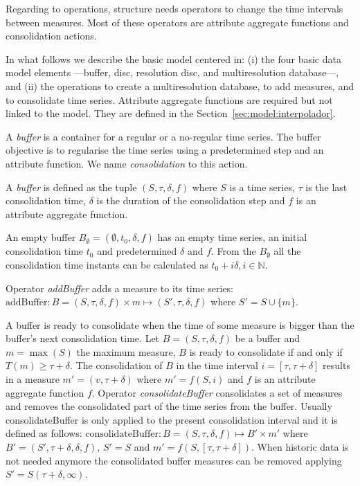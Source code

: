 Regarding to operations,  structure needs operators to
change the time intervals between measures. Most of these operators
are attribute aggregate functions and consolidation actions.

In what follows we describe the basic  model centered in:
(i) the four basic data model elements ---buffer, disc, resolution
disc, and multiresolution database---, and (ii) the operations to
create a multiresolution database, to add measures, and to consolidate
time series. Attribute aggregate functions are required but not linked
to the model. They are defined in the
Section~\ref{sec:model:interpolador}.

A \emph{buffer} is a container for a regular or a no-regular time
series. The buffer objective is to regularise the time series using a
predetermined step and an attribute function. We name
\emph{consolidation} to this action.
\begin{definition}[Buffer]
  A \emph{buffer} is defined as the tuple $(S,\tau,\delta,f)$ where
  $S$ is a time series, $\tau$ is the last consolidation time,
  $\delta$ is the duration of the consolidation step and $f$ is an
  attribute aggregate function.

  An empty buffer $B_{\emptyset} = (\emptyset,t_0, \delta, f)$ has an
  empty time series, an initial consolidation time $t_0$ and
  predetermined $\delta$ and $f$. From the $B_{\emptyset}$ all the
  consolidation time instants can be calculated as $t_0+i\delta,
  i\in\mathbb{N}$.
\end{definition}

Operator \emph{addBuffer} adds a measure to its time series:
$\text{addBuffer}: B = (S,\tau,\delta,f) \times m \mapsto
(S',\tau,\delta,f)$ where $S' = S \cup \{m\} $.

A buffer is ready to consolidate when the time of some measure is
bigger than the buffer's next consolidation time.  Let
$B=(S,\tau,\delta,f)$ be a buffer and $m=\max(S)$ the maximum measure,
$B$ is ready to consolidate if and only if $T(m) \geq \tau+\delta$.
The consolidation of $B$ in the time interval $i=[\tau,\tau+\delta]$
results in a measure $m'=(v,\tau+\delta)$ where $m'=f(S,i)$ and $f$ is
an attribute aggregate function $f$. Operator \emph{consolidateBuffer}
consolidates a set of measures and removes the consolidated part of
the time series from the buffer. Usually consolidateBuffer is only
applied to the present consolidation interval and it is defined as
follows: $\text{consolidateBuffer}: B=(S,\tau,\delta,f) \mapsto B'
\times m' $ where $ B'= (S',\tau+\delta,\delta,f)$, $S' = S$ and $m' =
f(S,[\tau,\tau+\delta])$. When historic data is not needed anymore the
consolidated buffer measures can be removed applying $S' =
S(\tau+\delta,\infty)$.

